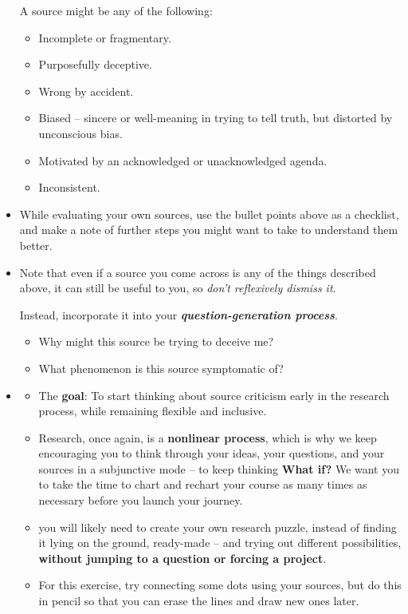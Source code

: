 \documentclass[11pt]{article}
\begin{document}
\begin{itemize}
A source might be any of the following:
\begin{itemize}
\item Incomplete or fragmentary. 
\item Purposefully deceptive.
\item Wrong by accident. 
\item Biased -- sincere or well-meaning in trying to tell truth, but distorted by unconscious bias. 
\item Motivated by an acknowledged or unacknowledged agenda. 
\item Inconsistent.
\end{itemize}

\item While evaluating your own sources, use the bullet points above as a checklist, and make a note of further steps you might want to take to understand them better.

\item Note that even if a source you come across is any of the things described above, it can still be useful to you, so \emph{don’t reflexively dismiss it}. 

Instead, incorporate it into your \emph{\textbf{question-generation process}}. 
\begin{itemize}
\item Why might this source be trying to deceive me? 
\item What phenomenon is this source symptomatic of?
\end{itemize}

\item \begin{exercise}
\begin{itemize}
\item The \textbf{goal}: To start thinking about source criticism early in the research process, while remaining flexible and inclusive.


\item Research, once again, is a \textbf{nonlinear process}, which is why we keep encouraging you to think through your ideas, your questions, and your sources in a subjunctive mode -- to keep thinking \textbf{What if?} We want you to take the time to chart and rechart your course as many times
as necessary before you launch your journey.

\item you will likely need to create your own research puzzle, instead of finding it lying on the ground, ready-made -- and trying out different possibilities, \textbf{without jumping to a question or forcing a project}.

\item For this exercise, try connecting some dots using your sources, but do this in pencil so that you can erase the lines and draw new ones later. 
\end{itemize}

\end{exercise}
\end{itemize}
\end{document}

